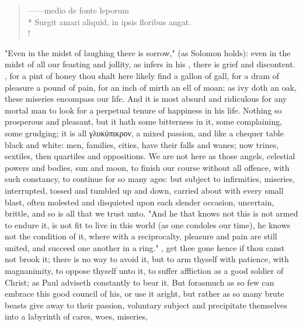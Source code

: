 \begin{latin}
\begin{verse}%
------medio de fonte leporum\\*
Surgit amari aliquid, in ipsis floribus angat.\\!
\end{verse}%
\end{latin}

"Even in the midst of laughing there is sorrow," (as
Solomon holds): even in the midst of all our feasting and
jollity, as \Austin infers in his , there is grief and discontent. , for a pint of honey thou shalt here likely find
a gallon of gall, for a dram of pleasure a pound of pain, for an inch of mirth
an ell of moan; as ivy doth an oak, these miseries encompass our life. And it
is most absurd and ridiculous for any mortal man to look for a perpetual tenure
of happiness in his life. Nothing so prosperous and pleasant, but it hath
some bitterness in it, some complaining, some grudging; it
is all \textgreek{γλυκύπικρον}, a mixed passion, and
like a chequer table black and white: men, families, cities, have their falls
and wanes; now trines, sextiles, then quartiles and oppositions. We are not
here as those angels, celestial powers and bodies, sun and moon, to finish our
course without all offence, with such constancy, to continue for so many ages:
but subject to infirmities, miseries, interrupted, tossed and tumbled up and
down, carried about with every small blast, often molested and disquieted upon
each slender occasion, uncertain, brittle, and so is all
that we trust unto. "And he that knows not this is not
armed to endure it, is not fit to live in this world (as one condoles our
time), he knows not the condition of it, where with a reciprocalty, pleasure
and pain are still united, and succeed one another in a ring." , get thee gone hence if thou canst not brook it; there is no way to
avoid it, but to arm thyself with patience, with magnanimity, to
oppose thyself unto it, to suffer affliction as a good
soldier of Christ; as Paul adviseth constantly to bear it.
But forasmuch as so few can embrace this good council of his, or use it aright,
but rather as so many brute beasts give away to their passion, voluntary
subject and precipitate themselves into a labyrinth of cares, woes, miseries,
